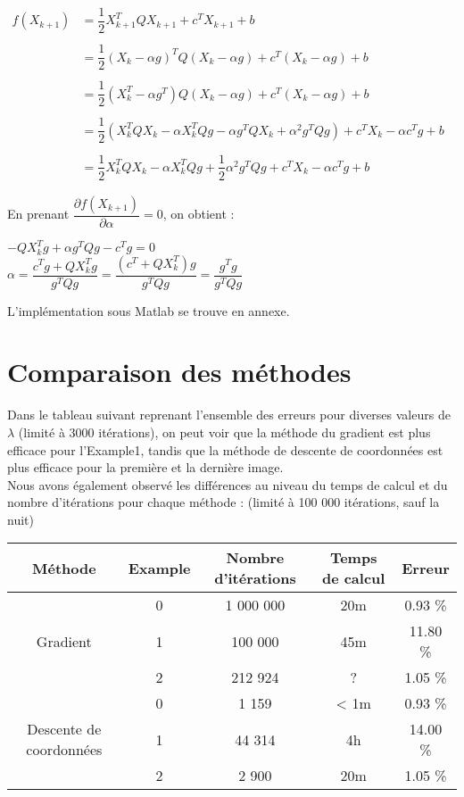 \documentclass[12pt, a4paper]{report}
\begin{document}
\begin{center}
$\begin{array}{rl}
f(X_{k+1}) & = \dfrac{1}{2}X_{k+1}^TQX_{k+1} + c^TX_{k+1} + b\\
\\& = \dfrac{1}{2}(X_k - \alpha g)^TQ(X_k - \alpha g) + c^T(X_k - \alpha g) + b\\
\\& = \dfrac{1}{2}(X_k^T - \alpha g^T)Q(X_k - \alpha g) + c^T(X_k - \alpha g) + b\\
\\& = \dfrac{1}{2}(X_k^T Q X_k- \alpha X_k^T Q g - \alpha g^T Q X_k + \alpha^2g^T Q g) + c^T X_k - \alpha c^T g + b\\
\\& = \dfrac{1}{2}X_k^T Q X_k- \alpha X_k^T Q g +\dfrac{1}{2}\alpha^2g^T Q g + c^T X_k - \alpha c^T g + b
\end{array}$
\bigbreak
\end{center}
En prenant $\dfrac{\partial f(X_{k+1})}{\partial \alpha} = 0$, on obtient :
\begin{center}
$ - Q X_k^T g + \alpha g^TQ g - c^T g = 0$\\
\bigbreak
$\alpha = \dfrac{c^T g + Q X_k^T g}{g^TQ g} = \dfrac{(c^T + Q X_k^T)g}{g^TQ g} = \dfrac{g^T g}{g^TQ g}$\\
\end{center}
\bigbreak
\noindent
L'implémentation sous Matlab se trouve en annexe.
\section{Comparaison des méthodes}
Dans le tableau suivant reprenant l'ensemble des erreurs pour diverses valeurs de $\lambda$ (limité à 3000 itérations), on peut voir que la méthode du gradient est plus efficace pour l'Example1, tandis que la méthode de descente de coordonnées est plus efficace pour la première et la dernière image. \\

Nous avons également observé les différences au niveau du temps de calcul et du nombre d'itérations pour chaque méthode : (limité à 100 000 itérations, sauf la nuit) \\
\begin{center}
\begin{tabular}{|c|c|c|c|c|}
\hline
Méthode & Example & Nombre d'itérations & Temps de calcul & Erreur \\
\hline
\multirow{3}{*}{Gradient} & 0 & 1 000 000 & 20m & 0.93 \% \\
 & 1 & 100 000 & 45m & 11.80 \% \\
 & 2 & 212 924 & ? & 1.05 \% \\
\hline
\multirow{3}{*}{Descente de coordonnées} & 0 & 1 159 & < 1m & 0.93 \% \\
 & 1 & 44 314 & 4h & 14.00 \% \\
 & 2 & 2 900 & 20m & 1.05 \% \\
\hline
\end{tabular}
\end{center}
\end{document}
